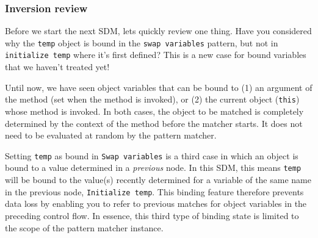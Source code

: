 \newpage
\genHeader
\hypertarget{invert close}{}

\subsubsection{Inversion review}

Before we start the next SDM, lets quickly review one thing. Have you considered why the \texttt{temp} object is bound in the \texttt{swap variables}
pattern, but not in \texttt{initialize temp} where it's first defined? This is a new case for bound variables that we haven't treated yet!

Until now, we have seen object variables that can be bound to (1) an argument of the method (set when the method is invoked), or (2) the
current object (\texttt{this}) whose method is invoked. In both cases, the object to be matched is completely determined by the context of the method before
the matcher starts. It does not need to be evaluated at random by the pattern matcher.

Setting \texttt{temp} as bound in \texttt{Swap variables} is a third case in which an object is bound to a value determined in a \emph{previous} node. In
this SDM, this means \texttt{temp} will be bound to the value(s) recently determined for a variable of the same name in the previous node, \texttt{Initialize
temp}. This binding feature therefore prevents data loss by enabling you to refer to previous matches for object variables in the preceding control flow. In
essence, this third type of binding state is limited to the scope of the pattern matcher instance.

